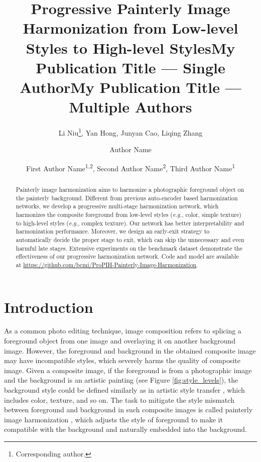 \documentclass[letterpaper]{article} %
\title{Progressive Painterly Image Harmonization from Low-level Styles to High-level Styles}
\author{
    Li Niu\thanks{Corresponding author.},
    Yan Hong,
    Junyan Cao,
    Liqing Zhang
    \\
}
\title{My Publication Title --- Single Author}
\author {
    Author Name
}
\title{My Publication Title --- Multiple Authors}
\author {
    First Author Name\textsuperscript{\rm 1,\rm 2},
    Second Author Name\textsuperscript{\rm 2},
    Third Author Name\textsuperscript{\rm 1}
}
\begin{document}
\maketitle

\begin{abstract}
Painterly image harmonization aims to harmonize a photographic foreground object on the painterly background. Different from previous auto-encoder based harmonization networks, we develop a progressive multi-stage harmonization network, which harmonizes the composite foreground from low-level styles (\emph{e.g.}, color, simple texture) to high-level styles (\emph{e.g.}, complex texture). Our network has better interpretability and harmonization performance. Moreover, we design an early-exit strategy to automatically decide the proper stage to exit, which can skip the unnecessary and even harmful late stages. Extensive experiments on the benchmark dataset demonstrate the effectiveness of our progressive harmonization network. Code and model are available at \url{https://github.com/bcmi/ProPIH-Painterly-Image-Harmonization}.
\end{abstract}

\section{Introduction} \label{sec:intro}

As a common photo editing technique, image composition refers to splicing a foreground object from one image and overlaying it on another background image. However, the foreground and background in the obtained composite image may have incompatible styles, which severely harms the quality of composite image.
Given a composite image, if the foreground is from a photographic image and the background is an artistic painting (see Figure \ref{fig:style_levels}), the background style could be defined similarly as in artistic style transfer \cite{gatys2016image,huang2017arbitrary,park2019arbitrary}, which includes color, texture, and so on. The task to mitigate the style mismatch between foreground and background in such composite images is
called painterly image harmonization \cite{luan2018deep}, which adjusts the style of foreground to make it compatible with the background and naturally embedded into the background.
\end{document}
